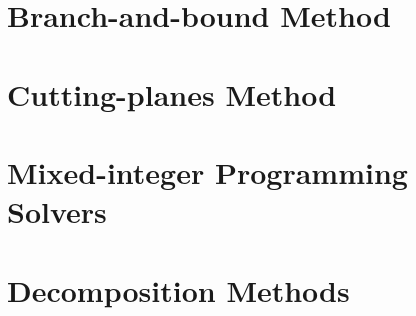 \documentclass{bookest}
\begin{document}
	\chapter{Branch-and-bound Method} \label{chapter_9}
	
	
	\chapter{Cutting-planes Method} \label{chapter_10}
	
	
	\chapter{Mixed-integer Programming Solvers} \label{chapter_11}
	
	
	\chapter{Decomposition Methods} \label{chapter_12}
	
	
	
	 
	
\end{document}
